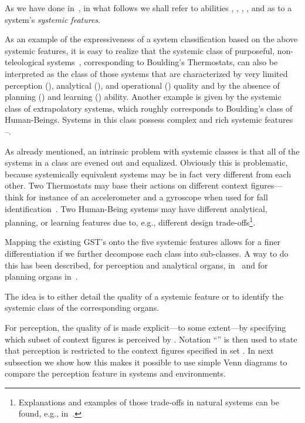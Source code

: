 \documentclass[twocolumn]{svjour3}
\def\M{\hbox{}}
\def\A{\hbox{}}
\def\P{\hbox{}}
\def\E{\hbox{}}
\def\K{\hbox{}}
\begin{document}
\begin{definition}
As we have done in~\cite{DF14b}, in what follows we shall refer to abilities \M, \A, \P, \E, and \K{}
as to a system's \emph{systemic features}.
\end{definition}

As an example of the expressiveness of a system classification based
on the above systemic features, it is easy to realize that
the systemic class of purposeful, non-teleological systems~\cite{RWB43},
corresponding to Boulding's Thermostats, can also be interpreted as
the class of those systems that are
characterized by very limited perception (\M), analytical (\A), and operational (\E) quality
and by the absence of planning (\P) and learning (\K) ability.
Another example is given by the systemic class of extrapolatory systems, which
roughly corresponds to Boulding's class of Human-Beings. Systems in this class
possess complex and rich systemic features \M--\K.

As already mentioned, an intrinsic problem with systemic classes is that all of the systems
in a class are evened out and equalized. Obviously this is problematic, because systemically equivalent systems
may be in fact very different from each other. Two Thermostats may base their actions
on different context figures---think for instance of an accelerometer and a gyroscope
when used for fall identification~\cite{DBLP:journals/corr/FlorioP15b,EDC2013}.
Two Human-Being systems may have different analytical, planning, or learning features
due to, e.g., different design trade-offs\footnote{Explanations and examples
	of those trade-offs in natural systems can be found,
	e.g., in~\cite{Nilsson08,Nilsson08b,WeWi55,Nilsson14}.}.

Mapping the existing GST's onto the five systemic features allows
for a finer differentiation if we further decompose each class into sub-classes.
A way to do this has been described, for perception and analytical organs,
in~\cite{DF12a} and for planning organs in~\cite{DF13b}.

The idea is to either detail the quality of a systemic feature or to identify
the systemic class of the corresponding organs.

For perception, the quality of \M{} is made explicit---to some extent---by specifying which
subset of context figures is perceived by \M. Notation ``'' is then used
to state that perception is restricted to the context figures
specified in set .
In next subsection we show how this makes it possible to use simple Venn diagrams to compare the perception feature
in systems and environments.
\end{document}
